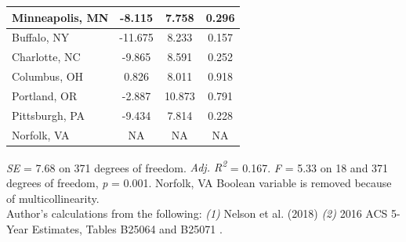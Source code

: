 \documentclass[paper=letter, fontsize=12pt]{scrartcl} %
\begin{document}
\begin{table}
\begin{center}
\begin{tabular}{|| l | c c c ||}
				\hline 
				Minneapolis, MN & 	-8.115	 & 	7.758	 & 	0.296	\\ 
				\hline 
				Buffalo, NY & 	-11.675	 & 	8.233	 & 	0.157	\\ 
				\hline 
				Charlotte, NC & 	-9.865	 & 	8.591	 & 	0.252	\\ 
				\hline 
				Columbus, OH & 	0.826	 & 	8.011	 & 	0.918	\\ 
				\hline 
				Portland, OR & 	-2.887	 & 	10.873	 & 	0.791	\\ 
				\hline 
				Pittsburgh, PA & 	-9.434	 & 	7.814	 & 	0.228	\\ 
				\hline 
				Norfolk, VA & 	NA	 & 	NA	 & 	NA	\\ 
				\hline 
			\end{tabular}
		\end{center}
		\textit{SE} = 7.68 on 371 degrees of freedom. \textit{Adj. R\textsuperscript{2}} = 0.167. \textit{F} = 5.33 on 18 and 371 degrees of freedom, \textit{p} = 0.001. Norfolk, VA Boolean variable is removed because of multicollinearity.\\
		Author's calculations from the following: \textit{(1)} Nelson et al. (2018) \cite{richmond} \textit{(2)} 2016 ACS 5-Year Estimates, Tables B25064 and B25071 \cite{acs16}.
	\end{table}
	
\end{document}
